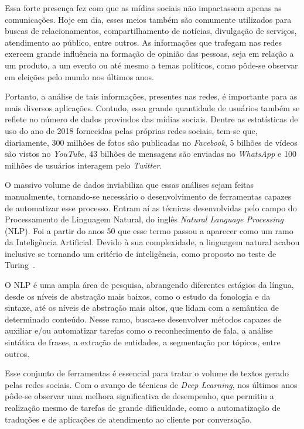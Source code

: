 Essa forte presença fez com que as mídias sociais não impactassem apenas as
comunicações.
Hoje em dia, esses meios também são comumente utilizados para buscas de
relacionamentos, compartilhamento de notícias, divulgação de serviços,
atendimento ao público, entre outros.
As informações que trafegam nas redes exercem grande influência na formação de
opinião das pessoas, seja em relação a um produto, a um evento ou até mesmo
a temas políticos, como pôde-se observar em eleições pelo mundo nos últimos anos.

Portanto, a análise de tais informações, presentes nas redes, é importante para
as mais diversos aplicações.
Contudo, essa grande quantidade de usuários também se reflete no número de dados
provindos das mídias sociais.
Dentre as estatísticas de uso do ano de 2018 fornecidas pelas próprias redes
sociais, tem-se que, diariamente, 300 milhões de fotos são publicadas no
\textit{Facebook}, 5 bilhões de vídeos são vistos no \textit{YouTube}, 43
bilhões de mensagens são enviadas no \textit{WhatsApp} e 100 milhões de usuários
interagem pelo \textit{Twitter}.

O massivo volume de dados inviabiliza que essas análises sejam feitas
manualmente, tornando-se necessário o desenvolvimento de ferramentas capazes de
automatizar esse processo.
Entram aí as técnicas desenvolvidas pelo campo do Processamento de Linguagem
Natural, do inglês \textit{Natural Language Processing} (NLP).
Foi a partir do anos 50 que esse termo passou a aparecer como um ramo da
Inteligência Artificial.
Devido à sua complexidade, a linguagem natural acabou inclusive se tornando um
critério de inteligência, como proposto no teste de Turing~\cite{turing50}.

O NLP é uma ampla área de pesquisa, abrangendo diferentes estágios da língua,
desde os níveis de abstração mais baixos, como o estudo da fonologia e da
sintaxe, até os níveis de abstração mais altos, que lidam com a semântica de
determinado conteúdo.
Nesse ramo, busca-se desenvolver métodos capazes de auxiliar e/ou automatizar
tarefas como o reconhecimento de fala, a análise sintática de frases, a
extração de entidades, a segmentação por tópicos, entre outros.

Esse conjunto de ferramentas é essencial para tratar o volume de textos
gerado pelas redes sociais. Com o avanço de técnicas de \textit{Deep Learning},
nos últimos anos pôde-se observar uma melhora significativa de desempenho, que
permitiu a realização mesmo de tarefas de grande dificuldade, como a
automatização de traduções e de aplicações de atendimento ao cliente por
conversação.

